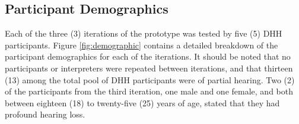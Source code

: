 \documentclass{sigchi-ext}
\begin{document}
\subsection{Participant Demographics}






Each of the three (3) iterations of the prototype was tested by five (5) DHH participants. Figure \ref{fig:demographic} contains a detailed breakdown of the participant demographics for each of the iterations. It should be noted that no participants or interpreters were repeated between iterations, and that thirteen (13) among the total pool of DHH participants were of partial hearing. Two (2) of the participants from the third iteration, one male and one female, and both between eighteen (18) to twenty-five (25) years of age, stated that they had profound hearing loss.
\end{document}

